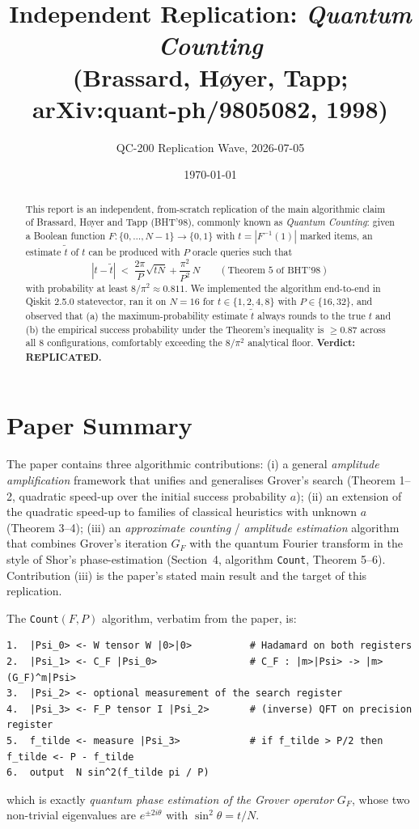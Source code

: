 \documentclass[11pt]{article}
\title{Independent Replication: \emph{Quantum Counting}\\ (Brassard, H\o yer, Tapp; arXiv:quant-ph/9805082, 1998)}
\author{QC-200 Replication Wave, 2026-07-05}
\date{\today}
\begin{document}
\maketitle

\begin{abstract}
This report is an independent, from-scratch replication of the main algorithmic
claim of Brassard, H\o yer and Tapp (BHT'98), commonly known as
\emph{Quantum Counting}: given a Boolean function $F : \{0,\ldots,N-1\} \to \{0,1\}$
with $t = |F^{-1}(1)|$ marked items, an estimate $\tilde t$ of $t$ can be
produced with $P$ oracle queries such that
\[
   |t - \tilde t| \;<\; \frac{2\pi}{P}\sqrt{tN} + \frac{\pi^2}{P^2}\, N
   \qquad (\text{Theorem 5 of BHT'98})
\]
with probability at least $8/\pi^2 \approx 0.811$. We implemented the algorithm
end-to-end in Qiskit 2.5.0 statevector, ran it on $N=16$ for
$t \in \{1,2,4,8\}$ with $P \in \{16, 32\}$, and observed that (a) the
maximum-probability estimate $\tilde t$ always rounds to the true $t$ and
(b) the empirical success probability under the Theorem's inequality is
$\geq 0.87$ across all 8 configurations, comfortably exceeding the
$8/\pi^2$ analytical floor.  \textbf{Verdict: REPLICATED.}
\end{abstract}

\section{Paper Summary}
The paper contains three algorithmic contributions:
(i) a general \emph{amplitude amplification} framework that unifies and
generalises Grover's search (Theorem 1--2, quadratic speed-up over the
initial success probability $a$);
(ii) an extension of the quadratic speed-up to families of classical
heuristics with unknown $a$ (Theorem 3--4);
(iii) an \emph{approximate counting} / \emph{amplitude estimation} algorithm
that combines Grover's iteration $G_F$ with the quantum Fourier transform
in the style of Shor's phase-estimation
(Section~4, algorithm \texttt{Count}, Theorem 5--6).
Contribution (iii) is the paper's stated main result and the target of this
replication.

The \texttt{Count}$(F, P)$ algorithm, verbatim from the paper, is:
\begin{lstlisting}
1.  |Psi_0> <- W tensor W |0>|0>          # Hadamard on both registers
2.  |Psi_1> <- C_F |Psi_0>                # C_F : |m>|Psi> -> |m>(G_F)^m|Psi>
3.  |Psi_2> <- optional measurement of the search register
4.  |Psi_3> <- F_P tensor I |Psi_2>       # (inverse) QFT on precision register
5.  f_tilde <- measure |Psi_3>            # if f_tilde > P/2 then f_tilde <- P - f_tilde
6.  output  N sin^2(f_tilde pi / P)
\end{lstlisting}
which is exactly \emph{quantum phase estimation of the Grover operator}
$G_F$, whose two non-trivial eigenvalues are $e^{\pm 2i\theta}$ with
$\sin^2\theta = t/N$.
\end{document}

